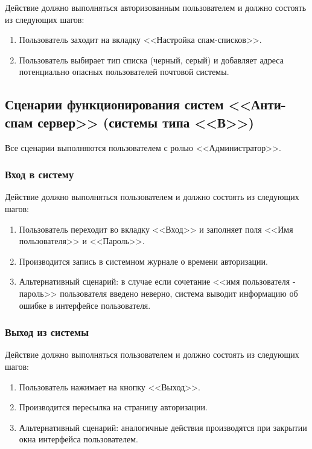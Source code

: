 Действие должно выполняться авторизованным пользователем и должно состоять из следующих шагов:
\begin{enumerate}
  \item Пользователь заходит на вкладку <<Настройка спам-списков>>.
  \item Пользователь выбирает тип списка (черный, серый) и добавляет адреса потенциально опасных пользователей почтовой системы.
\end{enumerate}

\subsection{Сценарии функционирования систем <<Анти-спам сервер>> (системы типа <<В>>)}
Все сценарии выполняются пользователем с ролью <<Администратор>>.

\subsubsection*{Вход в систему}
Действие должно выполняться пользователем и должно состоять из следующих шагов:
\begin{enumerate}
  \item Пользователь переходит во вкладку <<Вход>> и заполняет поля <<Имя пользователя>> и <<Пароль>>.
  \item Производится запись в системном журнале о времени авторизации.
  \item Альтернативный сценарий: в случае если сочетание <<имя пользователя - пароль>> пользователя введено неверно, система выводит информацию об ошибке в интерфейсе пользователя.
\end{enumerate}

\subsubsection*{Выход из системы}
Действие должно выполняться пользователем и должно состоять из следующих шагов:
\begin{enumerate}
  \item Пользователь нажимает на кнопку <<Выход>>.
  \item Производится пересылка на страницу авторизации.
  \item Альтернативный сценарий: аналогичные действия производятся при закрытии окна интерфейса пользователем.
\end{enumerate}

